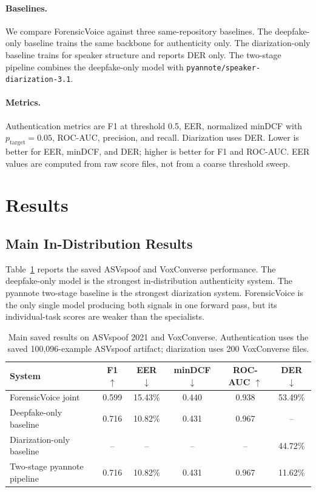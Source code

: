 \documentclass{article}
\newcommand{\fv}{ForensicVoice}
\newcommand{\eer}{EER}
\newcommand{\der}{DER}
\newcommand{\mindcf}{minDCF}
\newcommand{\asv}{ASVspoof}
\begin{document}
\paragraph{Baselines.}
We compare \fv{} against three same-repository baselines.  The deepfake-only
baseline trains the same backbone for authenticity only.  The diarization-only
baseline trains for speaker structure and reports \der{} only.  The two-stage
pipeline combines the deepfake-only model with
\texttt{pyannote/speaker-diarization-3.1}.

\paragraph{Metrics.}
Authentication metrics are F1 at threshold 0.5, \eer{}, normalized \mindcf{}
with $p_{\mathrm{target}}=0.05$, ROC-AUC, precision, and recall.  Diarization
uses \der{}.  Lower is better for \eer{}, \mindcf{}, and \der{}; higher is
better for F1 and ROC-AUC.  EER values are computed from raw score files, not
from a coarse threshold sweep.

\section{Results}

\subsection{Main In-Distribution Results}

Table~\ref{tab:main} reports the saved \asv{} and VoxConverse performance.  The
deepfake-only model is the strongest in-distribution authenticity system.  The
pyannote two-stage baseline is the strongest diarization system.  \fv{} is the
only single model producing both signals in one forward pass, but its
individual-task scores are weaker than the specialists.

\begin{table}[t]
  \centering
  \caption{Main saved results on \asv{} 2021 and VoxConverse. Authentication
  uses the saved 100,096-example \asv{} artifact; diarization uses 200
  VoxConverse files.}
  \label{tab:main}
  \small
  \begin{tabular}{lccccc}
    \toprule
    System & F1 $\uparrow$ & \eer{} $\downarrow$ & \mindcf{} $\downarrow$ &
    ROC-AUC $\uparrow$ & \der{} $\downarrow$ \\
    \midrule
    \fv{} joint & 0.599 & 15.43\% & 0.440 & 0.938 & 53.49\% \\
    Deepfake-only baseline & 0.716 & 10.82\% & 0.431 & 0.967 & -- \\
    Diarization-only baseline & -- & -- & -- & -- & 44.72\% \\
    Two-stage pyannote pipeline & 0.716 & 10.82\% & 0.431 & 0.967 & 11.62\% \\
    \bottomrule
  \end{tabular}
\end{table}
\end{document}
